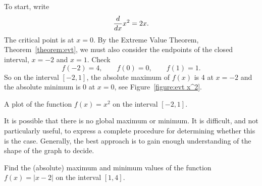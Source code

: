 \begin{solution}
To start, write
\[
\frac{d}{dx} x^2 = 2x.
\]
The critical point is at $x=0$. By the Extreme Value Theorem,
Theorem~\ref{theorem:evt}, we must also consider the endpoints of the
closed interval, $x=-2$ and $x=1$. Check
\[
f(-2) = 4, \qquad f(0) = 0, \qquad f(1) = 1.
\]
So on the interval $[-2,1]$, the absolute maximum of $f(x)$ is 4 at
$x=-2$ and the absolute minimum is 0 at $x=0$, see Figure~\ref{figure:evt x^2}.
\end{solution}\begin{marginfigure}
\caption{A plot of the function $f(x) = x^2$ on the interval $[-2,1]$.}
\label{figure:evt x^2}
\end{marginfigure}

It is possible that there is no global maximum or minimum. It is
difficult, and not particularly useful, to express a complete procedure for
determining whether this is the case. Generally, the best approach is
to gain enough understanding of the shape of the graph to
decide. 

\begin{example}
Find the (absolute) maximum and minimum values of the function $f(x)=
|x-2|$ on the interval $[1,4]$.
\end{example}

